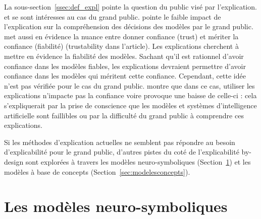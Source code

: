 \documentclass{report}
\begin{document}
    La sous-section~\ref{ssec:def_expl} pointe la question du public visé par l'explication. \cite{bell_its_2022} et \cite{kastner_relation_2021} se sont intéresses au cas du grand public. \cite{bell_its_2022} pointe le faible impact de l'explication sur la compréhension des décisions des modèles par le grand public. \cite{kastner_relation_2021} met aussi en évidence la nuance entre donner confiance (trust) et mériter la confiance (fiabilité) (trustability dans l'article). Les explications cherchent à mettre en évidence la fiabilité des modèles. Sachant qu'il est rationnel d'avoir confiance dans les modèles fiables, les explications devraient permettre d'avoir  confiance dans les modèles qui méritent cette confiance. Cependant, cette idée n'est pas vérifiée pour le cas du grand public. \cite{kastner_relation_2021} montre que dans ce cas, utiliser les explications n'impacte pas la confiance voire provoque une baisse de celle-ci : cela s'expliquerait par la prise de conscience que les modèles et systèmes d'intelligence artificielle sont faillibles ou par la difficulté du grand public à comprendre ces explications.
    
    Si les méthodes d'explication actuelles ne semblent pas répondre au besoin d'explicabilité pour le grand public, d'autres pistes du coté de l'explicabilité by-design sont explorées à travers les modèles neuro-symboliques (Section~\ref{sec:neuro-symbolique}) et les modèles à base de concepts (Section~\ref{sec:modelesconcepts}).

\section{Les modèles neuro-symboliques}
\label{sec:neuro-symbolique}
    
\end{document}
